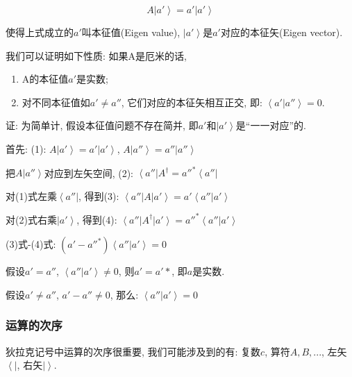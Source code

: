 \begin{equation*}
    A \left| a' \right\rangle = a' \left| a' \right\rangle
\end{equation*}

使得上式成立的$a'$叫本征值(Eigen value), $\left| a' \right\rangle$是$a'$对应的本征矢(Eigen vector).

我们可以证明如下性质: 如果A是厄米的话,

\begin{enumerate}
  \item A的本征值$a'$是实数;
  \item 对不同本征值如$a' \neq a''$, 它们对应的本征矢相互正交, 即: $\left\langle a' | a'' \right\rangle =0$.
\end{enumerate}

证: 为简单计, 假设本征值问题不存在简并, 即$a'$和$\left| a'
\right\rangle$是``一一对应''的.

首先: (1): $A \left| a' \right\rangle = a' \left| a' \right\rangle$,
$A \left| a'' \right\rangle = a'' \left| a'' \right\rangle$

把$A \left| a'' \right\rangle$对应到左矢空间, (2): $\left\langle a''
\right| A^{\dagger} = a''^* \left\langle a'' \right|$

对(1)式左乘$\left\langle a'' \right|$, 得到(3): $\left\langle a''
\right|A\left| a' \right\rangle = a' \left\langle a'' |a'
\right\rangle$

对(2)式右乘$\left| a' \right\rangle$, 得到(4): $\left\langle a''
\right| A^{\dagger} \left| a' \right\rangle = a''^* \left\langle a''
| a' \right\rangle$

(3)式-(4)式: $(a' - a''^*)\left\langle a'' | a' \right\rangle = 0$

假设$a' = a''$, $\left\langle a'' | a' \right\rangle \neq 0$, 则$a'
= a'*$, 即$a$是实数.

假设$a' \neq a''$, $a' - a'' \neq 0$, 那么: $\left\langle a'' | a'
\right\rangle = 0$

\subsubsection{运算的次序}

狄拉克记号中运算的次序很重要, 我们可能涉及到的有: 复数$c$, 算符$A,
B, ...$, 左矢$\left\langle {} \right|$, 右矢$\left| {}
\right\rangle$.

